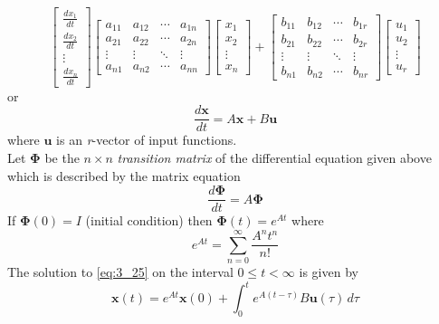 \documentclass[11pt]{book}
\theoremstyle{example}
\begin{document}
\begin{equation}
	\begin{bmatrix}
		\frac{dx_1}{dt}\\
		\frac{dx_2}{dt}\\
		\vdots\\
		\frac{dx_n}{dt}
	\end{bmatrix}
	\begin{bmatrix}
		a_{11}&a_{12}&\cdots&a_{1n}\\
		a_{21}&a_{22}&\cdots&a_{2n}\\
		\vdots&\vdots&\ddots&\vdots\\
		a_{n1}&a_{n2}&\cdots&a_{nn}
	\end{bmatrix}
	\begin{bmatrix}
		x_1\\
		x_2\\
		\vdots\\
		x_n
	\end{bmatrix}+
	\begin{bmatrix}
		b_{11}&b_{12}&\cdots&b_{1r}\\
		b_{21}&b_{22}&\cdots&b_{2r}\\
		\vdots&\vdots&\ddots&\vdots\\
		b_{n1}&b_{n2}&\cdots&b_{nr}
	\end{bmatrix}
	\begin{bmatrix}
		u_1\\
		u_2\\
		\vdots\\
		u_r
	\end{bmatrix}
\end{equation}
or
\begin{equation}
	\frac{d\mathbf{x}}{dt}=A\mathbf{x}+B\mathbf{u}\label{eq:3_25}
\end{equation}
where $\mathbf{u}$ is an \emph{r}-vector of input functions.\\
Let $\mathbf{\Phi}$ be the $n\times{n}$ \emph{transition matrix} of the differential equation given above which is described by the matrix equation
\begin{equation}
	\frac{d\mathbf{\Phi}}{dt}=A\mathbf{\Phi}
\end{equation}
If $\mathbf{\Phi}(0)=I$ (initial condition) then $\mathbf{\Phi}(t)=e^{At}$ where
\begin{equation}
	e^{At}=\sum_{n=0}^\infty{\frac{A^nt^n}{n!}}
\end{equation}
The solution to \eqref{eq:3_25} on the interval $0\leq{t}<\infty$ is given by
\begin{equation}
	\mathbf{x}(t)=e^{At}\mathbf{x}(0)+\int_0^t{e^{A(t-\tau)}B\mathbf{u}(\tau)\,d\tau}
\end{equation}
\end{document}
